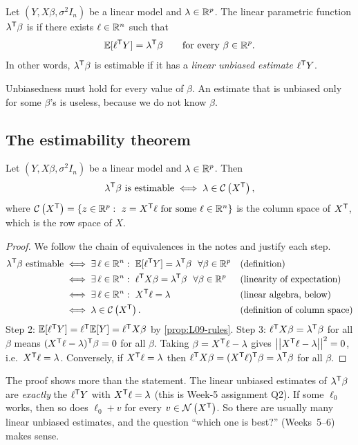 \begin{definition}[Estimable]\label{def:L10-estimable}
Let $(Y,X\beta,\sigma^2I_n)$ be a linear model and $\lambda\in\mathbb R^p$. The linear parametric function
$\lambda^{\mathsf T}\beta$ is  if there exists $\ell\in\mathbb R^n$ such that
\[
\mathbb E[\ell^{\mathsf T} Y]=\lambda^{\mathsf T}\beta\qquad\text{for every }\beta\in\mathbb R^p .
\]
In other words, $\lambda^{\mathsf T}\beta$ is estimable if it has a \emph{linear unbiased estimate} $\ell^{\mathsf T} Y$.
\end{definition}
Unbiasedness must hold for every value of $\beta$. An estimate that is unbiased only for some
$\beta$'s is useless, because we do not know $\beta$.

\subsection{The estimability theorem}
\begin{theorem}\label{thm:L10-estimable}
Let $(Y,X\beta,\sigma^2I_n)$ be a linear model and $\lambda\in\mathbb R^p$. Then
\[
\lambda^{\mathsf T}\beta \text{ is estimable}\iff \lambda\in\mathcal{C}\left(X^{\mathsf T}\right),
\]
where $\mathcal{C}\left(X^{\mathsf T}\right)=\{z\in\mathbb R^p:\ z=X^{\mathsf T}\ell\text{ for some }\ell\in\mathbb R^n\}$ is the column space of
$X^{\mathsf T}$, which is the row space of $X$.
\end{theorem}
\begin{proof}
We follow the chain of equivalences in the notes and justify each step.
\begin{align*}
\lambda\T\beta\text{ estimable}
&\iff \exists\,\ell\in\RR^n:\ \EE[\ell\T Y]=\lambda\T\beta\ \ \forall\beta\in\RR^p &&\text{(definition)}\\
&\iff \exists\,\ell\in\RR^n:\ \ell\T X\beta=\lambda\T\beta\ \ \forall\beta\in\RR^p &&\text{(linearity of expectation)}\\
&\iff \exists\,\ell\in\RR^n:\ X\T\ell=\lambda &&\text{(linear algebra, below)}\\
&\iff \lambda\in\colsp{X\T}. &&\text{(definition of column space)}
\end{align*}
Step 2: $\mathbb E[\ell^{\mathsf T} Y]=\ell^{\mathsf T}\mathbb E[Y]=\ell^{\mathsf T} X\beta$ by \cref{prop:L09-rules}.
Step 3: $\ell^{\mathsf T} X\beta=\lambda^{\mathsf T}\beta$ for all $\beta$ means $(X^{\mathsf T}\ell-\lambda)^{\mathsf T}\beta=0$ for all $\beta$.
Taking $\beta=X^{\mathsf T}\ell-\lambda$ gives $\left|\left|X^{\mathsf T}\ell-\lambda\right|\right|^2=0$, i.e.\ $X^{\mathsf T}\ell=\lambda$. Conversely,
if $X^{\mathsf T}\ell=\lambda$ then $\ell^{\mathsf T} X\beta=(X^{\mathsf T}\ell)^{\mathsf T}\beta=\lambda^{\mathsf T}\beta$ for all $\beta$.
\end{proof}

\begin{note}
The proof shows more than the statement. The linear unbiased estimates of $\lambda^{\mathsf T}\beta$ are
\emph{exactly} the $\ell^{\mathsf T} Y$ with $X^{\mathsf T}\ell=\lambda$ (this is Week-5 assignment Q2). If some
$\ell_0$ works, then so does $\ell_0+v$ for every $v\in\mathcal{N}\left(X^{\mathsf T}\right)$. So there are usually many
linear unbiased estimates, and the question ``which one is best?'' (Weeks~5--6) makes sense.
\end{note}

